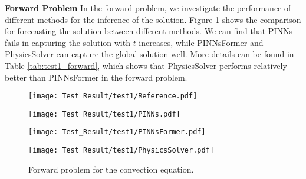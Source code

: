 \documentclass[preprint,11pt]{elsarticle}
\begin{document}
\textbf{Forward Problem}
In the forward problem, we investigate the performance of different methods for the inference of the solution. Figure \ref{fig:test1_forward} shows the comparison for forecasting the solution between different methods. We can find that PINNs fails in capturing the solution with $t$ increases, while PINNsFormer and PhysicsSolver can capture the global solution well. More details can be found in Table \ref{tab:test1_forward}, which shows that PhysicsSolver performs relatively better than PINNsFormer in the forward problem.
\begin{figure}[h]
    \begin{minipage}[b]{0.49\textwidth}
        \centering
        \texttt{[image: Test\_Result/test1/Reference.pdf]} 
    \end{minipage}
    \begin{minipage}[b]{0.49\textwidth}
        \centering
        \texttt{[image: Test\_Result/test1/PINNs.pdf]} 
    \end{minipage}
    \begin{minipage}[b]{0.49\textwidth}
        \centering
        \texttt{[image: Test\_Result/test1/PINNsFormer.pdf]} 
    \end{minipage}
    \begin{minipage}[b]{0.49\textwidth}
        \centering
        \texttt{[image: Test\_Result/test1/PhysicsSolver.pdf]} 
    \end{minipage}
    \caption{Forward problem for the convection equation.}
    \label{fig:test1_forward}
\end{figure}

\begin{table}[H]
\vspace{-15pt}
    
	
	\vskip 0.1in
	\centering
	\begin{small}
		\begin{sc}
			\renewcommand{\multirowsetup}{\centering}
			\setlength{\tabcolsep}{5.5pt}
		\end{sc}
	\end{small}
    \caption{Relative $l^2$ errors.}\label{tab:test1_forward}
\end{table}
\end{document}

